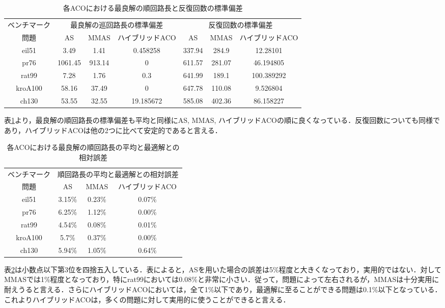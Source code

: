 \documentclass[a4j]{jsarticle}
\begin{document}
\begin{table}[htb]
 \begin{center}
  \caption{各ACOにおける最良解の順回路長と反復回数の標準偏差}
  \label{acosd}
  \begin{tabular}[tb]{|c||c|c|c||c|c|c|} \hline
 ベンチマーク& \multicolumn{3}{|c||}{最良解の巡回路長の標準偏差}& \multicolumn{3}{|c|}{反復回数の標準偏差} \\\cline{2-7}
問題 & AS & MMAS & ハイブリッドACO & AS & MMAS & ハイブリッドACO \\\hline
eil51 & 3.49 & 1.41 & 0.458258 & 337.94 & 284.9 & 12.28101 \\\hline
pr76 & 1061.45 & 913.14 & 0 & 611.57 & 281.07 & 46.194805 \\\hline
rat99 & 7.28 & 1.76 & 0.3 & 641.99 & 189.1 & 100.389292 \\\hline
kroA100 & 58.16 & 37.49 & 0 & 647.78 & 110.08 & 9.526804 \\\hline
ch130 & 53.55 & 32.55 & 19.185672 & 585.08 & 402.36 & 86.158227 \\\hline
  \end{tabular}
 \end{center}
\end{table}
\par
表\ref{acosd}より，最良解の順回路長の標準偏差も平均と同様にAS, MMAS, ハイブリッドACOの順に良くなっている．反復回数についても同様であり，ハイブリッドACOは他の2つに比べて安定的であると言える．

\begin{table}[htb]
 \begin{center}
  \caption{各ACOにおける最良解の順回路長の平均と最適解との相対誤差}
  \label{gosa}
  \begin{tabular}[tb]{|c||c|c|c|} \hline
   ベンチマーク& \multicolumn{3}{|c|}{順回路長の平均と最適解との相対誤差} \\\cline{2-4}
   問題 & AS & MMAS & ハイブリッドACO \\\hline
   eil51 & 3.15\% & 0.23\% & 0.07\% \\\hline
   pr76 & 6.25\% & 1.12\% & 0.00\% \\\hline
   rat99 & 4.54\% & 0.08\% & 0.01\% \\\hline
   kroA100 & 5.7\% & 0.37\% & 0.00\% \\\hline
   ch130 & 5.94\% & 1.05\% & 0.64\% \\\hline
  \end{tabular}
 \end{center}
\end{table}
\par
表\ref{gosa}は小数点以下第3位を四捨五入している．表によると，ASを用いた場合の誤差は5\%程度と大きくなっており，実用的ではない．対してMMASでは1\%程度となっており，特にrat99においては0.08\%と非常に小さい．従って，問題によって左右されるが，MMASは十分実用に耐えうると言える．さらにハイブリッドACOにおいては，全て1\%以下であり，最適解に至ることができる問題は0.1\%以下となっている．これよりハイブリッドACOは，多くの問題に対して実用的に使うことができると言える．
\end{document}
